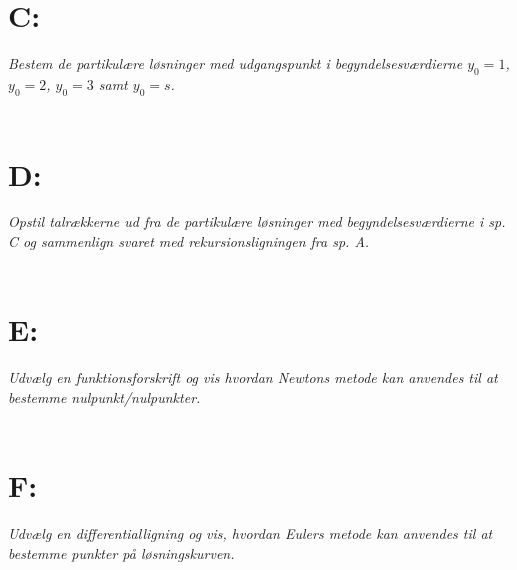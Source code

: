 \documentclass[a4paper, 11pt]{article}
\begin{document}
\section*{C:}
\textit{Bestem de partikulære løsninger med udgangspunkt i begyndelsesværdierne \(y_0=1\), \(y_0=2\), \(y_0=3\) samt \(y_0=s\).}\\\\

\section*{D:}
\textit{Opstil talrækkerne ud fra de partikulære løsninger med begyndelsesværdierne i sp. C og sammenlign svaret med rekursionsligningen fra sp. A.}\\\\

\section*{E:}
\textit{Udvælg en funktionsforskrift og vis hvordan Newtons metode kan anvendes til at bestemme nulpunkt/nulpunkter.}\\\\

\section*{F:}
\textit{Udvælg en differentialligning og vis, hvordan Eulers metode kan anvendes til at bestemme punkter på løsningskurven.}\\\\
\end{document}
